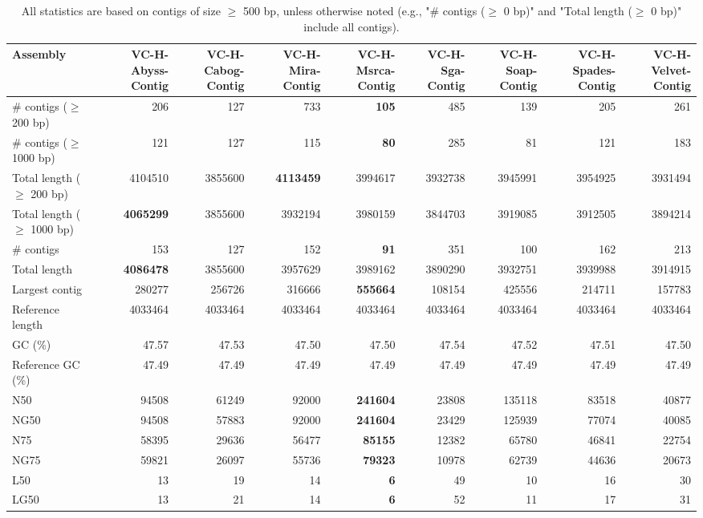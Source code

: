 \documentclass[12pt,a4paper]{article}
\begin{document}
\begin{table}[ht]
\begin{center}
\caption{All statistics are based on contigs of size $\geq$ 500 bp, unless otherwise noted (e.g., "\# contigs ($\geq$ 0 bp)" and "Total length ($\geq$ 0 bp)" include all contigs).}
\begin{tabular}{|l*{8}{|r}|}
\hline
Assembly & VC-H-Abyss-Contig & VC-H-Cabog-Contig & VC-H-Mira-Contig & VC-H-Msrca-Contig & VC-H-Sga-Contig & VC-H-Soap-Contig & VC-H-Spades-Contig & VC-H-Velvet-Contig \\ \hline
\# contigs ($\geq$ 200 bp) & 206 & 127 & 733 & {\bf 105} & 485 & 139 & 205 & 261 \\ \hline
\# contigs ($\geq$ 1000 bp) & 121 & 127 & 115 & {\bf 80} & 285 & 81 & 121 & 183 \\ \hline
Total length ($\geq$ 200 bp) & 4104510 & 3855600 & {\bf 4113459} & 3994617 & 3932738 & 3945991 & 3954925 & 3931494 \\ \hline
Total length ($\geq$ 1000 bp) & {\bf 4065299} & 3855600 & 3932194 & 3980159 & 3844703 & 3919085 & 3912505 & 3894214 \\ \hline
\# contigs & 153 & 127 & 152 & {\bf 91} & 351 & 100 & 162 & 213 \\ \hline
Total length & {\bf 4086478} & 3855600 & 3957629 & 3989162 & 3890290 & 3932751 & 3939988 & 3914915 \\ \hline
Largest contig & 280277 & 256726 & 316666 & {\bf 555664} & 108154 & 425556 & 214711 & 157783 \\ \hline
Reference length & 4033464 & 4033464 & 4033464 & 4033464 & 4033464 & 4033464 & 4033464 & 4033464 \\ \hline
GC (\%) & 47.57 & 47.53 & 47.50 & 47.50 & 47.54 & 47.52 & 47.51 & 47.50 \\ \hline
Reference GC (\%) & 47.49 & 47.49 & 47.49 & 47.49 & 47.49 & 47.49 & 47.49 & 47.49 \\ \hline
N50 & 94508 & 61249 & 92000 & {\bf 241604} & 23808 & 135118 & 83518 & 40877 \\ \hline
NG50 & 94508 & 57883 & 92000 & {\bf 241604} & 23429 & 125939 & 77074 & 40085 \\ \hline
N75 & 58395 & 29636 & 56477 & {\bf 85155} & 12382 & 65780 & 46841 & 22754 \\ \hline
NG75 & 59821 & 26097 & 55736 & {\bf 79323} & 10978 & 62739 & 44636 & 20673 \\ \hline
L50 & 13 & 19 & 14 & {\bf 6} & 49 & 10 & 16 & 30 \\ \hline
LG50 & 13 & 21 & 14 & {\bf 6} & 52 & 11 & 17 & 31 \\ \hline

\end{tabular}
\end{center}
\end{table}
\end{document}
